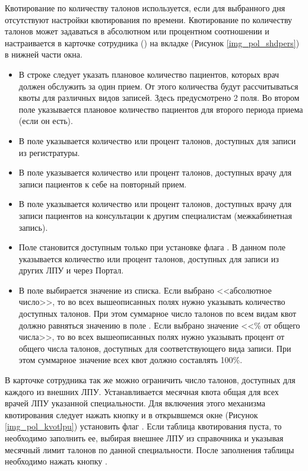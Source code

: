 Квотирование по количеству талонов используется, если для выбранного дня отсутствуют настройки квотирования по времени. Квотирование по количеству талонов может задаваться в абсолютном или процентном соотношении и настраивается в карточке сотрудника () на вкладке  (Рисунок \ref{img_pol_shdpers}) в нижней части окна.
\begin{itemize}
 \item В строке  следует указать плановое количество пациентов, которых врач должен обслужить за один прием. От этого количества будут рассчитываться квоты для различных видов записей. Здесь предусмотрено 2 поля. Во втором поле указывается плановое количество пациентов для второго периода приема (если он есть).
 \item В поле  указывается количество или процент талонов, доступных для записи из регистратуры.
 \item В поле  указывается количество или процент талонов, доступных врачу для записи пациентов к себе на повторный прием.
 \item В поле  указывается количество или процент талонов, доступных врачу для записи пациентов на консультации к другим специалистам (межкабинетная запись).
 \item Поле  становится доступным только при установке флага . В данном поле указывается количество или процент талонов, доступных для записи из других ЛПУ и через Портал.
 \item В поле  выбирается значение из списка. Если выбрано <<абсолютное число>>, то во всех вышеописанных полях нужно указывать количество доступных талонов. При этом суммарное число талонов по всем видам квот должно равняться значению в поле . Если выбрано значение <<\% от общего числа>>, то во всех вышеописанных полях нужно указывать процент от общего числа талонов, доступных для соответствующего вида записи. При этом суммарное значение всех квот должно составлять 100\%.
\end{itemize}

В карточке сотрудника так же можно ограничить число талонов, доступных для каждого из внешних ЛПУ. Устанавливается месячная квота общая для всех врачей ЛПУ указанной специальности. Для включения этого механизма квотирования следует нажать кнопку  и в открывшемся окне (Рисунок \ref{img_pol_kvotlpu}) установить флаг . Если таблица квотирования пуста, то необходимо заполнить ее, выбирая внешнее ЛПУ из справочника и указывая месячный лимит талонов по данной специальности. После заполнения таблицы необходимо нажать кнопку .

